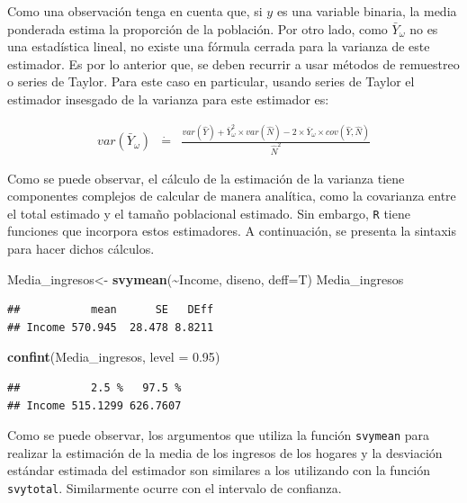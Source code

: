 \documentclass[
  12pt,
]{book}
\newenvironment{Shaded}{\begin{snugshade}}{\end{snugshade}}
\newcommand{\AttributeTok}[1]{\textcolor[rgb]{0.13,0.29,0.53}{#1}}
\newcommand{\FloatTok}[1]{\textcolor[rgb]{0.00,0.00,0.81}{#1}}
\newcommand{\FunctionTok}[1]{\textcolor[rgb]{0.13,0.29,0.53}{\textbf{#1}}}
\newcommand{\NormalTok}[1]{#1}
\newcommand{\OtherTok}[1]{\textcolor[rgb]{0.56,0.35,0.01}{#1}}
\newcommand{\SpecialCharTok}[1]{\textcolor[rgb]{0.81,0.36,0.00}{\textbf{#1}}}
\begin{document}
Como una observación tenga en cuenta que, si \(y\) es una variable
binaria, la media ponderada estima la proporción de la población.
Por otro lado, como \(\bar{Y}_{\omega}\) no es una estadística lineal,
no existe una fórmula cerrada para la varianza de este estimador.
Es por lo anterior que, se deben recurrir a usar métodos de remuestreo
o series de Taylor. Para este caso en particular, usando series de
Taylor el estimador insesgado de la varianza para este estimador es:

\begin{eqnarray*}
var\left(\bar{Y}_{\omega}\right) & \dot{=} & \frac{var\left(\hat{Y}\right)+\bar{Y}_{\omega}^{2}\times var\left(\hat{N}\right)-2\times\bar{Y}_{\omega}\times cov\left(\hat{Y},\hat{N}\right)}{\hat{N}^{2}}
\end{eqnarray*}

Como se puede observar, el cálculo de la estimación de la varianza tiene componentes complejos de calcular de manera analítica, como la covarianza entre el total estimado y el tamaño poblacional estimado. Sin embargo, \texttt{R} tiene funciones que incorpora estos estimadores. A continuación, se presenta la sintaxis para hacer dichos cálculos.

\begin{Shaded}
\begin{Highlighting}[]
\NormalTok{Media\_ingresos}\OtherTok{\textless{}{-}} \FunctionTok{svymean}\NormalTok{(}\SpecialCharTok{\textasciitilde{}}\NormalTok{Income, diseno, }\AttributeTok{deff=}\NormalTok{T)}
\NormalTok{Media\_ingresos}
\end{Highlighting}
\end{Shaded}

\begin{verbatim}
##           mean      SE   DEff
## Income 570.945  28.478 8.8211
\end{verbatim}

\begin{Shaded}
\begin{Highlighting}[]
\FunctionTok{confint}\NormalTok{(Media\_ingresos, }\AttributeTok{level =} \FloatTok{0.95}\NormalTok{)}
\end{Highlighting}
\end{Shaded}

\begin{verbatim}
##           2.5 %   97.5 %
## Income 515.1299 626.7607
\end{verbatim}

Como se puede observar, los argumentos que utiliza la función \texttt{svymean} para realizar la estimación de la media de los ingresos de los hogares y la desviación estándar estimada del estimador son similares a los utilizando con la función \texttt{svytotal}. Similarmente ocurre con el intervalo de confianza.
\end{document}
